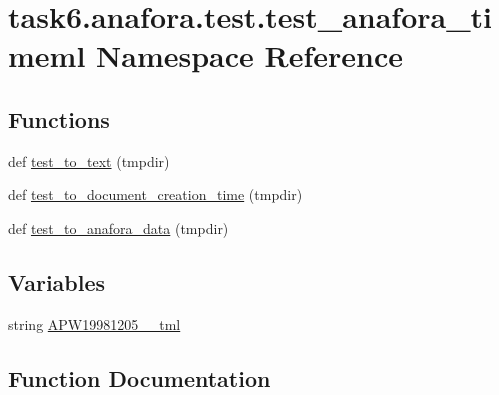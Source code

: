 \hypertarget{namespacetask6_1_1anafora_1_1test_1_1test__anafora__timeml}{}\section{task6.\+anafora.\+test.\+test\+\_\+anafora\+\_\+timeml Namespace Reference}
\label{namespacetask6_1_1anafora_1_1test_1_1test__anafora__timeml}
\subsection*{Functions}
\begin{DoxyCompactItemize}
\item 
def \hyperlink{namespacetask6_1_1anafora_1_1test_1_1test__anafora__timeml_a59096652bcd67630120cdb0473c49909}{test\+\_\+to\+\_\+text} (tmpdir)
\item 
def \hyperlink{namespacetask6_1_1anafora_1_1test_1_1test__anafora__timeml_adaeb5335d3e334fdee6ff5aaf5307057}{test\+\_\+to\+\_\+document\+\_\+creation\+\_\+time} (tmpdir)
\item 
def \hyperlink{namespacetask6_1_1anafora_1_1test_1_1test__anafora__timeml_aa5994677d54284b3ee3d418a7f456eee}{test\+\_\+to\+\_\+anafora\+\_\+data} (tmpdir)
\end{DoxyCompactItemize}
\subsection*{Variables}
\begin{DoxyCompactItemize}
\item 
string \hyperlink{namespacetask6_1_1anafora_1_1test_1_1test__anafora__timeml_a0b41f2ad70558ffc12d9803d5cd828cb}{A\+P\+W19981205\+\_\+\_\+tml}
\end{DoxyCompactItemize}


\subsection{Function Documentation}
\mbox{\label{namespacetask6_1_1anafora_1_1test_1_1test__anafora__timeml_aa5994677d54284b3ee3d418a7f456eee}} 
